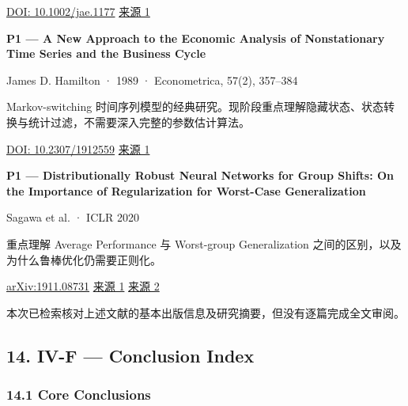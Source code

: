 \href{https://doi.org/10.1002/jae.1177}{DOI: 10.1002/jae.1177} \href{https://onlinelibrary.wiley.com/doi/full/10.1002/jae.1177}{来源 1}

\textbf{P1 --- A New Approach to the Economic Analysis of Nonstationary Time Series and the Business Cycle}

James D. Hamilton · 1989 · Econometrica, 57(2), 357--384

Markov-switching 时间序列模型的经典研究。现阶段重点理解隐藏状态、状态转换与统计过滤，不需要深入完整的参数估计算法。

\href{https://doi.org/10.2307/1912559}{DOI: 10.2307/1912559} \href{https://ideas.repec.org/a/ecm/emetrp/v57y1989i2p357-84.html}{来源 1}

\textbf{P1 --- Distributionally Robust Neural Networks for Group Shifts: On the Importance of Regularization for Worst-Case Generalization}

Sagawa et al. · ICLR 2020

重点理解 Average Performance 与 Worst-group Generalization 之间的区别，以及为什么鲁棒优化仍需要正则化。

\href{https://arxiv.org/abs/1911.08731}{arXiv:1911.08731} \href{https://arxiv.org/abs/1911.08731}{来源 1} \href{https://mlanthology.org/iclr/2020/sagawa2020iclr-distributionally/}{来源 2}

本次已检索核对上述文献的基本出版信息及研究摘要，但没有逐篇完成全文审阅。

\hypertarget{part-4-77-0001-iv-f-conclusion-index}{%
\subsection{14. IV-F --- Conclusion Index}\label{part-4-77-0001-iv-f-conclusion-index}}

\hypertarget{part-4-77-0001-core-conclusions}{%
\subsubsection{14.1 Core Conclusions}\label{part-4-77-0001-core-conclusions}}

